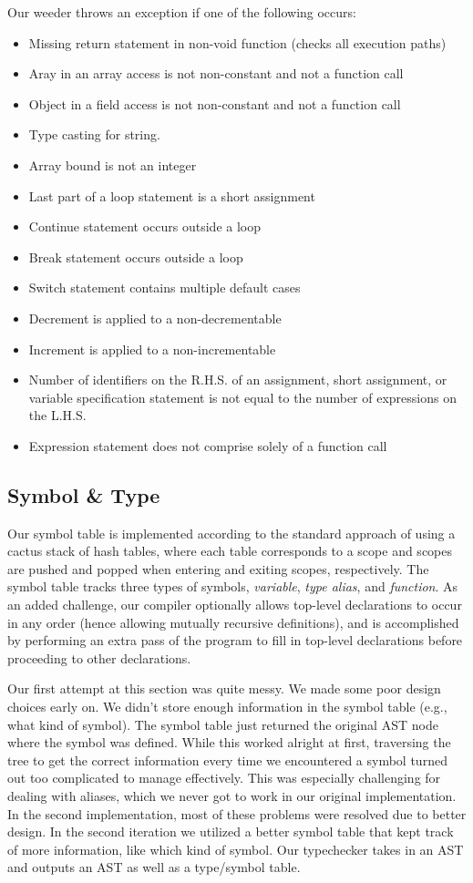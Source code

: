 \documentclass{article}
\begin{document}
Our weeder throws an exception if one of the following occurs:
\begin{itemize}
\item Missing return statement in non-void function (checks all execution paths)
\item Aray in an array access is not non-constant and not a function call
\item Object in a field access is not non-constant and not a function call
\item Type casting for string.
\item Array bound is not an integer
\item Last part of a loop statement is a short assignment
\item Continue statement occurs outside a loop
\item Break statement occurs outside a loop
\item Switch statement contains multiple default cases
\item Decrement is applied to a non-decrementable
\item Increment is applied to a non-incrementable
\item Number of identifiers on the R.H.S. of an assignment, short assignment, or variable specification statement is not equal to the number of expressions on the L.H.S.
\item Expression statement does not comprise solely of a function call
\end{itemize}

\subsection{Symbol \& Type}

Our symbol table is implemented according to the standard approach of using a cactus stack of hash tables, where each table corresponds to a scope and scopes are pushed and popped when entering and exiting scopes, respectively. The symbol table tracks three types of symbols, \textit{variable}, \textit{type alias}, and \textit{function}. As an added challenge, our compiler optionally allows top-level declarations to occur in any order (hence allowing mutually recursive definitions), and is accomplished by performing an extra pass of the program to fill in top-level declarations before proceeding to other declarations.

Our first attempt at this section was quite messy. We made some poor design choices early on. We didn't store enough information in the symbol table (e.g., what kind of symbol). The symbol table just returned the original AST node where the symbol was defined. While this worked alright at first, traversing the tree to get the correct information every time we encountered a symbol turned out too complicated to manage effectively. This was especially challenging for dealing with aliases, which we never got to work in our original implementation. In the second implementation, most of these problems were resolved due to better design. In the second iteration we utilized a better symbol table that kept track of more information, like which kind of symbol. Our typechecker takes in an AST and outputs an AST as well as a type/symbol table.
\end{document}
